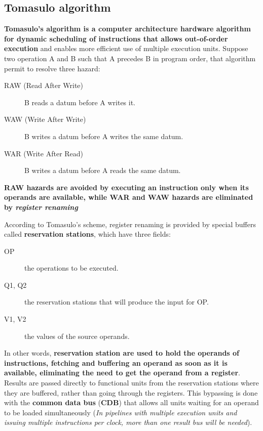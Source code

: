 \documentclass[10pt,a4paper]{article}
\begin{document}
\subsection{Tomasulo algorithm}

\textbf{Tomasulo’s algorithm is a computer architecture hardware algorithm for dynamic scheduling of instructions that allows out-of-order execution} and enables more efficient use of multiple execution units. Suppose two operation A and B such that A precedes B in program order, that algorithm permit to resolve three hazard:

\begin{description}
\item[RAW (Read After Write)] B reads a datum before A writes it.
\item[WAW (Write After Write)] B writes a datum before A writes the same datum.
\item[WAR (Write After Read)] B writes a datum before A reads the same datum.
\end{description}

\textbf{RAW hazards are avoided by executing an instruction only when its operands are available, while WAR and WAW hazards are eliminated by \textit{register renaming}}


According to Tomasulo's scheme, register renaming is provided by special buffers called \textbf{reservation stations}, which have three fields:

\begin{description}
\item[OP] the operations to be executed.
\item[Q1, Q2] the reservation stations that will produce the input for OP.
\item[V1, V2] the values of the source operands.
\end{description}

In other words, \textbf{reservation station are used to hold the operands of instructions, fetching and buffering an operand as soon as it is available, eliminating the need to get the operand from a register}. Results are passed directly to functional units from the reservation stations where they are buffered, rather than going through the registers. This bypassing is done with the \textbf{common data bus} (\textbf{CDB}) that  allows  all  units  waiting for an operand to be loaded simultaneously (\textit{In pipelines with multiple execution units and issuing multiple instructions per clock, more than one result bus will be needed}).
\end{document}
